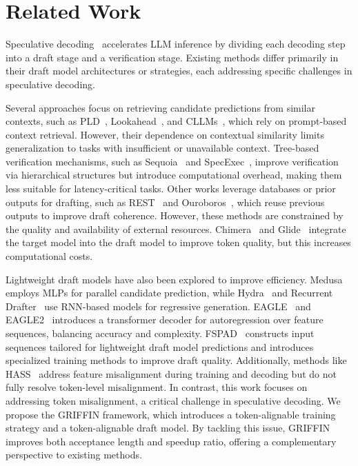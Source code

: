 \section{Related Work}
Speculative decoding~\cite{sun2024spectr, miao2024specinfer, chen2023cascade, kim2024speculative, liu2023online} accelerates LLM inference by dividing each decoding step into a draft stage and a verification stage. Existing methods differ primarily in their draft model architectures or strategies, each addressing specific challenges in speculative decoding.  

Several approaches focus on retrieving candidate predictions from similar contexts, such as PLD~\cite{saxena2023prompt}, Lookahead~\cite{fu2024break}, and CLLMs~\cite{kou2024cllms}, which rely on prompt-based context retrieval. However, their dependence on contextual similarity limits generalization to tasks with insufficient or unavailable context. Tree-based verification mechanisms, such as Sequoia~\cite{chen2024sequoia} and SpecExec~\cite{svirschevski2024specexec}, improve verification via hierarchical structures but introduce computational overhead, making them less suitable for latency-critical tasks.
Other works leverage databases or prior outputs for drafting, such as REST~\cite{he2023rest} and Ouroboros~\cite{zhao2024ouroboros}, which reuse previous outputs to improve draft coherence. However, these methods are constrained by the quality and availability of external resources. Chimera~\cite{zeng2024chimera} and Glide~\cite{du2024glide} integrate the target model into the draft model to improve token quality, but this increases computational costs.  

Lightweight draft models have also been explored to improve efficiency. Medusa~\cite{cai2024medusa} employs MLPs for parallel candidate prediction, while Hydra~\cite{ankner2024hydra} and Recurrent Drafter~\cite{cheng2024recurrent} use RNN-based models for regressive generation. EAGLE~\cite{li2024eagle} and EAGLE2~\cite{li2024eagle2} introduces a transformer decoder for autoregression over feature sequences, balancing accuracy and complexity. FSPAD~\cite{gui2024boosting} constructs input sequences tailored for lightweight draft model predictions and introduces specialized training methods to improve draft quality. Additionally, methods like HASS~\cite{zhang2024learning} address feature misalignment during training and decoding but do not fully resolve token-level misalignment.  
In contrast, this work focuses on addressing token misalignment, a critical challenge in speculative decoding. We propose the GRIFFIN framework, which introduces a token-alignable training strategy and a token-alignable draft model. By tackling this issue, GRIFFIN improves both acceptance length and speedup ratio, offering a complementary perspective to existing methods.